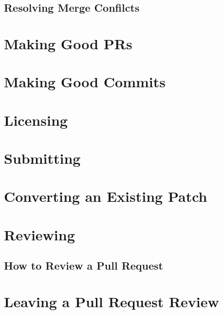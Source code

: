 \documentclass[]{book}
\begin{document}
\hypertarget{resolving-merge-confilcts}{%
\subsection{Resolving Merge Confilcts}\label{resolving-merge-confilcts}}

\hypertarget{making-good-prs}{%
\section{Making Good PRs}\label{making-good-prs}}

\hypertarget{making-good-commits}{%
\section{Making Good Commits}\label{making-good-commits}}

\hypertarget{licensing}{%
\section{Licensing}\label{licensing}}

\hypertarget{submitting}{%
\section{Submitting}\label{submitting}}

\hypertarget{converting-an-existing-patch}{%
\section{Converting an Existing Patch}\label{converting-an-existing-patch}}

\hypertarget{reviewing}{%
\section{Reviewing}\label{reviewing}}

\hypertarget{how-to-review-a-pull-request}{%
\subsection{How to Review a Pull Request}\label{how-to-review-a-pull-request}}

\hypertarget{leaving-a-pull-request-review}{%
\section{Leaving a Pull Request Review}\label{leaving-a-pull-request-review}}
\end{document}
